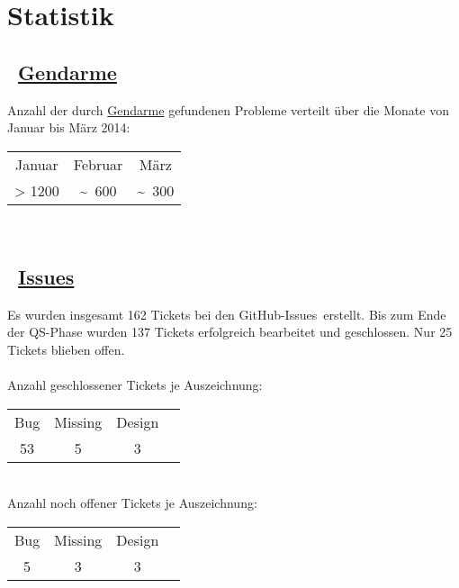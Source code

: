 %



\newpage



\section{Statistik}
\label{Abschnitt:Programmfehler:Statistik}





\subsection*{\mousecursor~\hyperref[Abschnitt:Programmfehler:Werkzeuge:Automatisiert]{Gendarme}}

Anzahl der durch \hyperref[Abschnitt:Programmfehler:Werkzeuge:Automatisiert]{Gendarme} gefundenen Probleme verteilt über die Monate von Januar bis März 2014:\\

\begin{longtable}{ccc}

	  Januar
	& Februar
	& März
	
	\\
	
      > 1200
	& \textasciitilde~600
	& \textasciitilde~300

\end{longtable}


~\\

\subsection*{\mousecursor~\hyperref[Abschnitt:Programmfehler:Werkzeuge:Manuell]{\glqq Issues\grqq}}

Es wurden insgesamt 162 Tickets bei den GitHub-\glqq Issues\grqq~erstellt. Bis zum Ende der QS-Phase wurden 137 Tickets erfolgreich bearbeitet und geschlossen. Nur 25 Tickets blieben offen.\\~\\

Anzahl geschlossener Tickets je Auszeichnung:\\

\begin{longtable}{cccc}

	  Bug
	& Missing
	& Design
	
	\\
	
      53
	& 5
	& 3

\end{longtable}

~\\

Anzahl noch offener Tickets je Auszeichnung:\\

\begin{longtable}{cccc}

	  Bug
	& Missing
	& Design
	
	\\
	
      5
	& 3
	& 3

\end{longtable}

~\\






